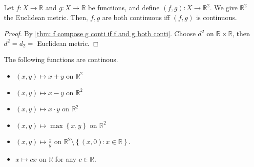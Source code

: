 \begin{lemma}
    Let \(f: X \to \mathbb{R} \) and \(g: X \to \mathbb{R} \) be functions, and define \((f, g): X \to \mathbb{R}^2 \). We give \(\mathbb{R} ^2\) the Euclidean metric. Then, \(f, g\) are both continuous iff \((f, g)\) is continuous.       
\end{lemma}
\begin{proof}
    By \autoref{thm: f compose g conti if f and g both conti}. Choose \(d^2\) on \(\mathbb{R} \times \mathbb{R} \), then \(d^2 = d_2 = \) Euclidean metric.    
\end{proof}

\begin{lemma}
    The following functions are continous. 
    \begin{itemize}
        \item \((x, y) \mapsto x + y\) on \(\mathbb{R} ^2\) 
        \item \((x, y) \mapsto x - y\) on \(\mathbb{R} ^2\) 
        \item \((x, y) \mapsto x \cdot y\) on \(\mathbb{R} ^2\)
        \item \((x, y) \mapsto \max \left\{ x, y \right\} \) on \(\mathbb{R} ^2\) 
        \item \((x, y) \mapsto \frac{x}{y}\) on \(\mathbb{R} ^2 \setminus \left\{ (x, 0) : x \in \mathbb{R}  \right\} \). 
        \item \(x \mapsto cx\) on \(\mathbb{R} \) for any \(c \in \mathbb{R} \).         
    \end{itemize}
\end{lemma}
